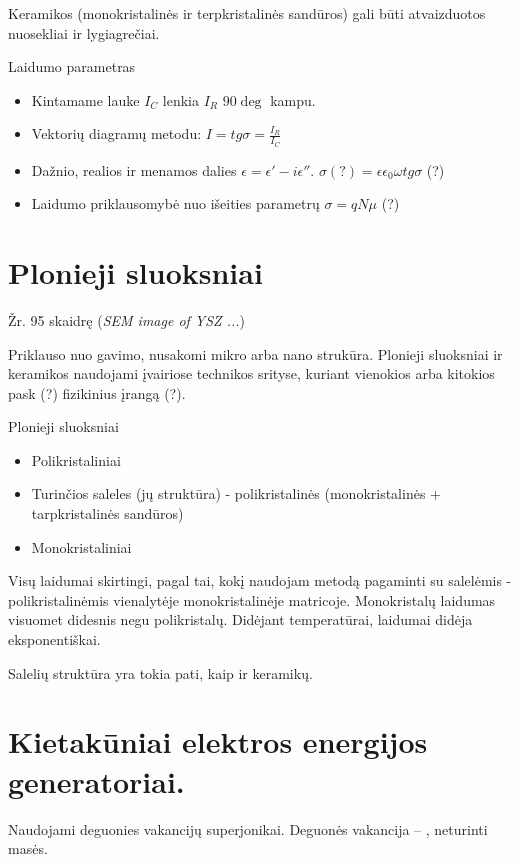 \begin{remember}
  \item Keramikos (monokristalinės ir terpkristalinės sandūros) gali
  būti atvaizduotos nuosekliai ir lygiagrečiai.
  \item Laidumo parametras\begin{itemize}
    \item Kintamame lauke $I_C$ lenkia $I_R$ $90\deg$ kampu.
    \item Vektorių diagramų metodu: $I = tg \sigma = \frac{I_R}{I_C}$
    \item Dažnio, realios ir menamos dalies
    $\epsilon = \epsilon' - i\epsilon''$.
    $\sigma (?) = \epsilon \epsilon_0 \omega tg \sigma$ (?)
    \item Laidumo priklausomybė nuo išeities parametrų
    $\sigma = qN\mu$ (?)
  \end{itemize}
\end{remember}


\section{Plonieji sluoksniai}
Žr. 95 skaidrę (\textit{SEM image of YSZ ...})

Priklauso nuo gavimo, nusakomi mikro arba nano strukūra.
Plonieji sluoksniai ir keramikos naudojami įvairiose technikos srityse,
kuriant vienokios arba kitokios pask (?) fizikinius įrangą (?).

Plonieji sluoksniai\begin{itemize}
  \item Polikristaliniai
  \item Turinčios saleles (jų struktūra) - polikristalinės
  (monokristalinės + tarpkristalinės sandūros)
  \item Monokristaliniai
\end{itemize}

Visų laidumai skirtingi, pagal tai,
kokį naudojam metodą pagaminti su salelėmis - polikristalinėmis vienalytėje monokristalinėje matricoje.
Monokristalų laidumas visuomet didesnis negu polikristalų.
Didėjant temperatūrai, laidumai didėja eksponentiškai.

Salelių struktūra yra tokia pati, kaip ir keramikų.

\section{Kietakūniai elektros energijos generatoriai.}
Naudojami deguonies vakancijų superjonikai. Deguonės vakancija – ,
neturinti masės.

